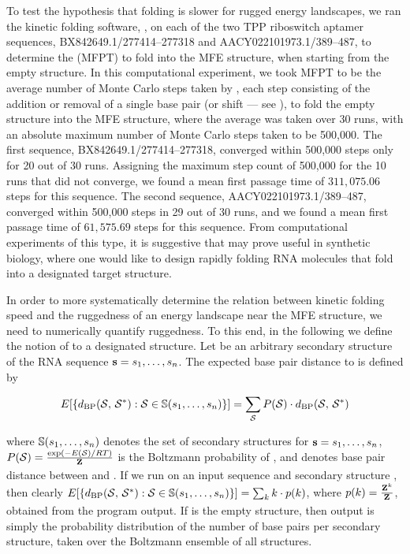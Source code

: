 To test the hypothesis that folding is slower for rugged energy landscapes,
we ran the kinetic folding software, \kinfold \citep{flamm},
on each of the two TPP riboswitch aptamer sequences,
BX842649.1/277414--277318 and AACY022101973.1/389--487,
to determine the \mfpt (MFPT) to
fold into the MFE structure, when starting from the empty structure.
In this computational
experiment, we took MFPT to be the average number of Monte Carlo steps
taken by \kinfold, each step consisting of the addition or removal
of a single base pair (or shift --- see \citep{flamm}), to fold the
empty structure into the MFE
structure, where the average was taken over 30 runs, with an absolute
maximum number of Monte Carlo steps taken to be 500,000.
The first sequence, BX842649.1/277414--277318, converged within 500,000
steps only for 20 out of 30 runs. Assigning the maximum step count of
500,000 for the 10 runs that did not converge, we found a mean first
passage time of $311,075.06$ steps for this sequence.
The second sequence, AACY022101973.1/389--487, converged within 500,000
steps in 29 out of 30 runs, and we found a mean first passage time of
$61,575.69$ steps for this sequence. From computational experiments of this
type, it is suggestive that \fftbor may prove useful in synthetic
biology,
where one would like to design rapidly folding RNA molecules that
fold into a designated target structure.

In order to more systematically determine the relation between kinetic
folding speed and the ruggedness of an energy landscape near the MFE structure,
we need to numerically quantify ruggedness. To this end, in the following
we define the notion of \ebpd to a designated
structure. Let \strSt be an arbitrary secondary structure of the RNA sequence
${\bf s} = s_1,\dots,s_n$.
The expected base pair distance to \strSt is defined by

\begin{align}
E[ \{ d_{\text{BP}}(\mathcal S,\,\mathcal S^*) : \mathcal S \in \mathbb{S}(s_1,\dots,s_n)\} ] =
\sum_{\mathcal S} P(\mathcal S) \cdot d_{\text{BP}}(\mathcal S,\,\mathcal S^*)
\end{align}

where
$\mathbb{S}(s_1,\dots,s_n)$ denotes the set of secondary structures for
${\bf s} = s_1,\dots,s_n$, $P(\mathcal S) = \frac{\exp(-E(\mathcal S)/RT)}{{\bf Z}^{}_{}}$ is the Boltzmann
probability of \str, and
\dBP{\str}{\strSt} denotes base pair distance between \str and \strSt.
If we run \fftbor on an input sequence \seq and secondary structure
\strSt, then clearly
$E[ \{ d_{\text{BP}}(\mathcal S,\,\mathcal S^*) : \mathcal S \in \mathbb{S}(s_1,\dots,s_n)\} ] =
\sum_{k} k \cdot p(k)$, where $p(k)=\frac{{\bf Z}^{k}_{}}{{\bf Z}^{}_{}}$, obtained from the
program output.  If \strSt is the empty structure, then \fftbor output
is simply the probability distribution of the number of base pairs per
secondary structure, taken over the Boltzmann ensemble of all structures.

